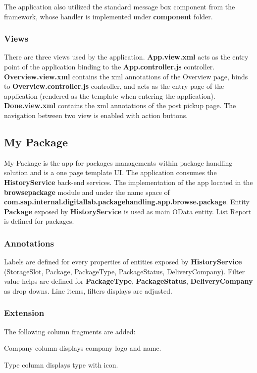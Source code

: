The application also utilized the standard message box component from the framework, whose handler is implemented under \textbf{component} folder.

\subsubsection{Views}
There are three views used by the application. \textbf{App.view.xml} acts as the entry point of the application binding to the \textbf{App.controller.js} controller. \textbf{Overview.view.xml} contains the xml annotations of the Overview page, binds to \textbf{Overview.controller.js} controller, and acts as the entry page of the application (rendered as the template when entering the application). \textbf{Done.view.xml} contains the xml annotations of the post pickup page. The navigation between two view is enabled with action buttons.

\subsection{My Package}

My Package is the app for packages managements within package handling solution and is a one page template UI.
The application consumes the \textbf{HistoryService} back-end services.
The implementation of the app
located in the \textbf{browsepackage} module and under the name space of
\textbf{com.sap.internal.digitallab.packagehandling.app.browse.package}.
Entity \textbf{Package} exposed by  \textbf{HistoryService} is used as main OData entity.
List Report is defined for packages.

\subsubsection{Annotations}
Labels are defined for every properties of entities exposed by \textbf{HistoryService} (StorageSlot, Package, PackageType, PackageStatus, DeliveryCompany). 
Filter value helps are defined for \textbf{PackageType}, \textbf{PackageStatus}, \textbf{DeliveryCompany} as drop downs.
Line items, filters displays are adjusted.

\subsubsection{Extension}

\bigskip
The following column fragments are added:
\begin{compactenum}
    \item Company column displays company logo and name.
    \item Type column displays type with icon.
\end{compactenum}

